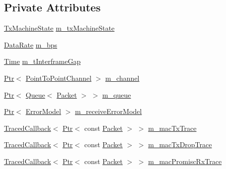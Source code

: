 \subsection*{Private Attributes}
\begin{DoxyCompactItemize}
\item 
\hyperlink{classns3_1_1PointToPointNetDevice_a963e2da767f0ac1b49a74eeb7b63e417}{Tx\+Machine\+State} \hyperlink{classns3_1_1PointToPointNetDevice_ad5896856f00b39aa0cc090f2e1a1e184}{m\+\_\+tx\+Machine\+State}
\item 
\hyperlink{classns3_1_1DataRate}{Data\+Rate} \hyperlink{classns3_1_1PointToPointNetDevice_a188a0f39b73b58cd7b61e008ad72d5f7}{m\+\_\+bps}
\item 
\hyperlink{classns3_1_1Time}{Time} \hyperlink{classns3_1_1PointToPointNetDevice_abb83cd1c35683a34deb50cb0e1bcf55d}{m\+\_\+t\+Interframe\+Gap}
\item 
\hyperlink{classns3_1_1Ptr}{Ptr}$<$ \hyperlink{classns3_1_1PointToPointChannel}{Point\+To\+Point\+Channel} $>$ \hyperlink{classns3_1_1PointToPointNetDevice_a1792fcbe4da3c93ed8aaa2dcc1914029}{m\+\_\+channel}
\item 
\hyperlink{classns3_1_1Ptr}{Ptr}$<$ \hyperlink{classns3_1_1Queue}{Queue}$<$ \hyperlink{classns3_1_1Packet}{Packet} $>$ $>$ \hyperlink{classns3_1_1PointToPointNetDevice_accb023eb99ce542c5a33bb5e79b7c2eb}{m\+\_\+queue}
\item 
\hyperlink{classns3_1_1Ptr}{Ptr}$<$ \hyperlink{classns3_1_1ErrorModel}{Error\+Model} $>$ \hyperlink{classns3_1_1PointToPointNetDevice_a685e60184c60bf96abc011081e1d589b}{m\+\_\+receive\+Error\+Model}
\item 
\hyperlink{classns3_1_1TracedCallback}{Traced\+Callback}$<$ \hyperlink{classns3_1_1Ptr}{Ptr}$<$ const \hyperlink{classns3_1_1Packet}{Packet} $>$ $>$ \hyperlink{classns3_1_1PointToPointNetDevice_a1f915201c9a40e6221a61477590ddfef}{m\+\_\+mac\+Tx\+Trace}
\item 
\hyperlink{classns3_1_1TracedCallback}{Traced\+Callback}$<$ \hyperlink{classns3_1_1Ptr}{Ptr}$<$ const \hyperlink{classns3_1_1Packet}{Packet} $>$ $>$ \hyperlink{classns3_1_1PointToPointNetDevice_ae8c1d85f19dd5ae51c2ec0bde51f716d}{m\+\_\+mac\+Tx\+Drop\+Trace}
\item 
\hyperlink{classns3_1_1TracedCallback}{Traced\+Callback}$<$ \hyperlink{classns3_1_1Ptr}{Ptr}$<$ const \hyperlink{classns3_1_1Packet}{Packet} $>$ $>$ \hyperlink{classns3_1_1PointToPointNetDevice_a12dd8c413178e96b65bf9d05bedb1c0a}{m\+\_\+mac\+Promisc\+Rx\+Trace}
\item 

\end{DoxyCompactItemize}
